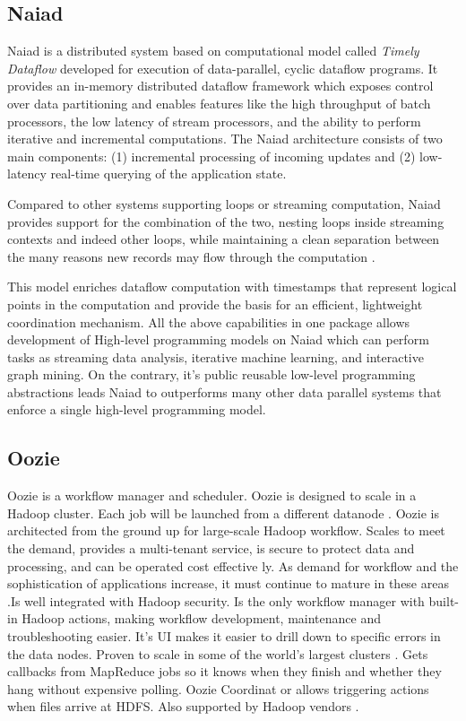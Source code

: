 \subsection{Naiad}

    Naiad \cite{paper-naiad} is a distributed system based on
    computational model called {\em Timely Dataflow} developed for
    execution of data-parallel, cyclic dataflow programs. It provides
    an in-memory distributed dataflow framework which exposes control
    over data partitioning and enables features like the high
    throughput of batch processors, the low latency of stream
    processors, and the ability to perform iterative and incremental
    computations. The Naiad architecture consists of two main
    components: (1) incremental processing of incoming updates and (2)
    low-latency real-time querying of the application state.
    
    Compared to other systems supporting loops or streaming
    computation, Naiad provides support for the combination of the
    two, nesting loops inside streaming contexts and indeed other
    loops, while maintaining a clean separation between the many
    reasons new records may flow through the computation
    \cite{www-naiad}.
    
    This model enriches dataflow computation with timestamps that
    represent logical points in the computation and provide the basis
    for an efficient, lightweight coordination mechanism.  All the
    above capabilities in one package allows development of High-level
    programming models on Naiad which can perform tasks as streaming
    data analysis, iterative machine learning, and interactive graph
    mining. On the contrary, it's public reusable low-level
    programming abstractions leads Naiad to outperforms many other
    data parallel systems that enforce a single high-level programming
    model.
    
\subsection{Oozie}

Oozie is a workflow manager and scheduler. Oozie is designed to scale
in a Hadoop cluster. Each job will be launched from a different
datanode \cite{paper-Oozie} \cite{www-Oozie1}.  Oozie
\cite{www-Oozie2} is architected from the ground up for large-scale
Hadoop workflow. Scales to meet the demand, provides a multi-tenant
service, is secure to protect data and processing, and can be operated
cost effective ly. As demand for workflow and the sophistication of
applications increase, it must continue to mature in these areas
\cite{paper-Oozie}.Is well integrated with Hadoop security. Is the
only workflow manager with built-in Hadoop actions, making workflow
development, maintenance and troubleshooting easier. It’s UI makes it
easier to drill down to specific errors in the data nodes. Proven to
scale in some of the world’s largest clusters \cite{paper-Oozie}. Gets
callbacks from MapReduce jobs so it knows when they finish and whether
they hang without expensive polling. Oozie Coordinat or allows
triggering actions when files arrive at HDFS. Also supported by Hadoop
vendors \cite{paper-Oozie}.
	
